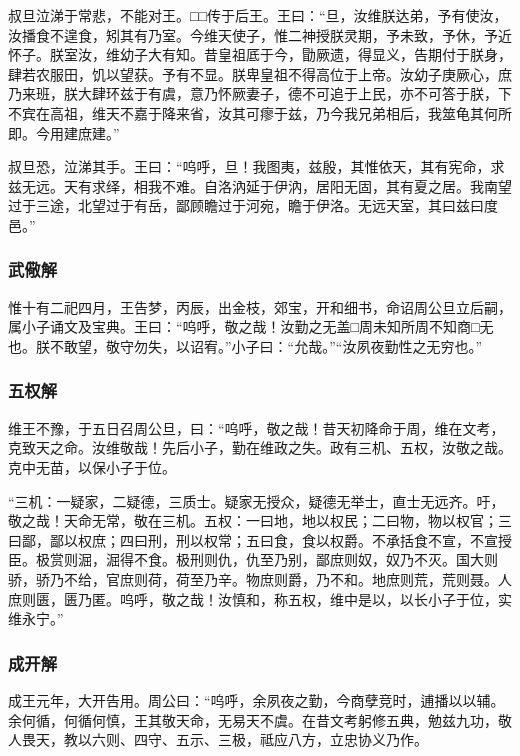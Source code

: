 \documentclass[]{article}
\begin{document}
叔旦泣涕于常悲，不能对王。□□传于后王。王曰：``旦，汝维朕达弟，予有使汝，汝播食不遑食，矧其有乃室。今维天使子，惟二神授朕灵期，予未致，予休，予近怀子。朕室汝，维幼子大有知。昔皇祖厎于今，勖厥遗，得显义，告期付于朕身，肆若农服田，饥以望获。予有不显。朕卑皇祖不得高位于上帝。汝幼子庚厥心，庶乃来班，朕大肆环兹于有虞，意乃怀厥妻子，德不可追于上民，亦不可答于朕，下不宾在高祖，维天不嘉于降来省，汝其可瘳于兹，乃今我兄弟相后，我筮龟其何所即。今用建庶建。''

叔旦恐，泣涕其手。王曰：``呜呼，旦！我图夷，兹殷，其惟依天，其有宪命，求兹无远。天有求绎，相我不难。自洛汭延于伊汭，居阳无固，其有夏之居。我南望过于三途，北望过于有岳，鄙顾瞻过于河宛，瞻于伊洛。无远天室，其曰兹曰度邑。''

\hypertarget{header-n243}{%
\subsubsection{武儆解}\label{header-n243}}

惟十有二祀四月，王告梦，丙辰，出金枝，郊宝，开和细书，命诏周公旦立后嗣，属小子诵文及宝典。王曰：``呜呼，敬之哉！汝勤之无盖□周未知所周不知商□无也。朕不敢望，敬守勿失，以诏宥。''小子曰：``允哉。''``汝夙夜勤性之无穷也。''

\hypertarget{header-n247}{%
\subsubsection{五权解}\label{header-n247}}

维王不豫，于五日召周公旦，曰：``呜呼，敬之哉！昔天初降命于周，维在文考，克致天之命。汝维敬哉！先后小子，勤在维政之失。政有三机、五权，汝敬之哉。克中无苗，以保小子于位。

``三机：一疑家，二疑德，三质士。疑家无授众，疑德无举士，直士无远齐。吁，敬之哉！天命无常，敬在三机。五权：一曰地，地以权民；二曰物，物以权官；三曰鄙，鄙以权庶；四曰刑，刑以权常；五曰食，食以权爵。不承括食不宣，不宣授臣。极赏则淈，淈得不食。极刑则仇，仇至乃别，鄙庶则奴，奴乃不灭。国大则骄，骄乃不给，官庶则荷，荷至乃辛。物庶则爵，乃不和。地庶则荒，荒则聂。人庶则匮，匮乃匿。呜呼，敬之哉！汝慎和，称五权，维中是以，以长小子于位，实维永宁。''

\hypertarget{header-n251}{%
\subsubsection{成开解}\label{header-n251}}

成王元年，大开告用。周公曰：``呜呼，余夙夜之勤，今商孽竞时，逋播以以辅。余何循，何循何慎，王其敬天命，无易天不虞。在昔文考躬修五典，勉兹九功，敬人畏天，教以六则、四守、五示、三极，祗应八方，立忠协义乃作。
\end{document}
